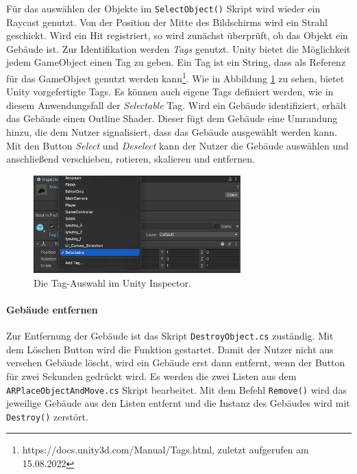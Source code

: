 Für das auswählen der Objekte im \texttt{SelectObject()} Skript wird wieder ein Raycast genutzt. Von der Position der Mitte des Bildschirms wird ein Strahl geschickt. Wird ein Hit registriert, so wird zunächst überprüft, ob das Objekt ein Gebäude ist. Zur Identifikation werden \textit{Tags} genutzt. Unity bietet die Möglichkeit jedem GameObject einen Tag zu geben. Ein Tag ist ein String, dass als Referenz für das GameObject genutzt werden kann\footnote{https://docs.unity3d.com/Manual/Tags.html, zuletzt aufgerufen am 15.08.2022}. Wie in Abbildung \ref*{fig:anwendung-umsetzung-tags} zu sehen, bietet Unity vorgefertigte Tags. Es können auch eigene Tags definiert werden, wie in diesem Anwendungsfall der \textit{Selectable} Tag. Wird ein Gebäude identifiziert, erhält das Gebäude einen Outline Shader. Dieser fügt dem Gebäude eine Umrandung hinzu, die dem Nutzer signalisiert, dass das Gebäude ausgewählt werden kann. Mit den Button \textit{Select} und \textit{Deselect} kann der Nutzer die Gebäude auswählen und anschließend verschieben, rotieren, skalieren und entfernen.

\begin{figure}[H]
    \centering
    \includegraphics[width=8cm]{img/anwendung/technisch/controller/umsetzung-tags.jpg}
    \caption{Die Tag-Auswahl im Unity Inspector.}
    \label{fig:anwendung-umsetzung-tags}
\end{figure}

\paragraph*{Gebäude entfernen}
Zur Entfernung der Gebäude ist das Skript \texttt{DestroyObject.cs} zuständig. Mit dem Löschen Button wird die Funktion gestartet. Damit der Nutzer nicht aus versehen Gebäude löscht, wird ein Gebäude erst dann entfernt, wenn der Button für zwei Sekunden gedrückt wird. Es werden die zwei Listen aus dem \texttt{ARPlaceObjectAndMove.cs} Skript bearbeitet. Mit dem Befehl \texttt{Remove()} wird das jeweilige Gebäude aus den Listen entfernt und die Instanz des Gebäudes wird mit \texttt{Destroy()} zerstört.

